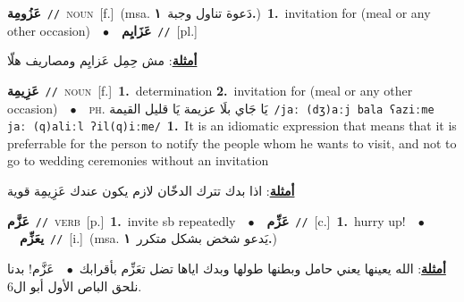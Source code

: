 \documentclass[10pt,a4paper,twoside]{article} %
\begin{document}
\begin{multicols}{2}
{\setlength\topsep{0pt}\textbf{\foreignlanguage{arabic}{عَزُومِة}}\ {\color{gray}\texttt{//}\color{black}}\ \textsc{noun}\ [f.]\ \color{gray}(msa. \foreignlanguage{arabic}{دَعوة تناول وجبة}~\foreignlanguage{arabic}{\textbf{١.}})\color{black}\ \textbf{1.}~invitation for (meal or any other occasion)\ \ $\bullet$\ \ \setlength\topsep{0pt}\textbf{\foreignlanguage{arabic}{عَزَايِم}}\ {\color{gray}\texttt{//}\color{black}}\ [pl.]\  \begin{flushright}\color{gray}\foreignlanguage{arabic}{\textbf{\underline{\foreignlanguage{arabic}{أمثلة}}}: مش حِمِل عَزايِم ومصاريف هلّا}\end{flushright}\color{black}} \vspace{2mm}

{\setlength\topsep{0pt}\textbf{\foreignlanguage{arabic}{عَزِيمِة}}\ {\color{gray}\texttt{//}\color{black}}\ \textsc{noun}\ [f.]\ \textbf{1.}~determination  \textbf{2.}~invitation for (meal or any other occasion)\ \ $\bullet$\ \ \textsc{ph.} \color{gray} \foreignlanguage{arabic}{يَا جَاي بلَا عزيمة يَا قليل القيمة}\color{black}\ {\color{gray}\texttt{/{\sffamily jaː (dʒ)aːj bala ʕaziːme jaː (q)aliːl ʔil(q)iːme}/}\color{black}}\ \textbf{1.}~It is an idiomatic expression that means that it is preferrable for the person to notify the people whom he wants to visit, and not to go to wedding ceremonies without an invitation\  \begin{flushright}\color{gray}\foreignlanguage{arabic}{\textbf{\underline{\foreignlanguage{arabic}{أمثلة}}}: اذا بدك تترك الدخّان لازم يكون عندك عَزِيمِة قوية}\end{flushright}\color{black}} \vspace{2mm}

{\setlength\topsep{0pt}\textbf{\foreignlanguage{arabic}{عَزَّم}}\ {\color{gray}\texttt{//}\color{black}}\ \textsc{verb}\ [p.]\ \textbf{1.}~invite sb repeatedly\ \ $\bullet$\ \ \setlength\topsep{0pt}\textbf{\foreignlanguage{arabic}{عَزِّم}}\ {\color{gray}\texttt{//}\color{black}}\ [c.]\ \textbf{1.}~hurry up!\ \ $\bullet$\ \ \setlength\topsep{0pt}\textbf{\foreignlanguage{arabic}{يعَزِّم}}\ {\color{gray}\texttt{//}\color{black}}\ [i.]\ \color{gray}(msa. \foreignlanguage{arabic}{يَدعو شخض بشكل متكرر}~\foreignlanguage{arabic}{\textbf{١.}})\color{black}\  \begin{flushright}\color{gray}\foreignlanguage{arabic}{\textbf{\underline{\foreignlanguage{arabic}{أمثلة}}}: الله يعينها يعني حامل وبطنها طولها وبدك اياها تضل تعَزِّم بأقرابك\ $\bullet$\ \  عَزَّم! بدنا نلحق الباص الأول أبو ال6.}\end{flushright}\color{black}} \vspace{2mm}


\end{multicols}
\end{document}
